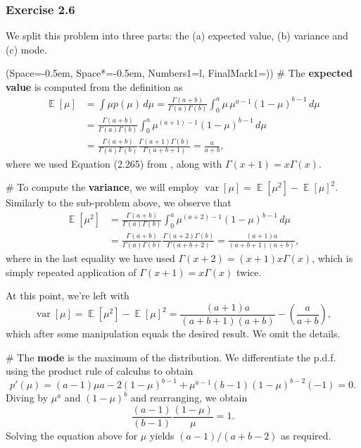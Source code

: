 \documentclass[12pt, a4paper]{article}
\newcommand{\listSpace}{-0.5em}%
\DeclareMathOperator{\E}{\mathbb{E}}
\DeclareMathOperator{\var}{\operatorname{var}}
\begin{document}
\subsubsection*{Exercise 2.6}
We split this problem into three parts: the (a) expected value, (b) variance and (c) mode.
\begin{easylist}[enumerate]
	\ListProperties(Space=\listSpace, Space*=\listSpace, Numbers1=l, FinalMark1={)})
	# The \textbf{expected value} is computed from the definition as
	\begin{align*}
		\E[\mu] &= \int \mu p(\mu) \, d\mu =  \frac{\Gamma(a + b)}{\Gamma(a ) \Gamma( b)} \int_0^a \mu \, \mu^{a-1} (1- \mu)^{b-1} \, d\mu \\
		&= \frac{\Gamma(a + b)}{\Gamma(a ) \Gamma( b)} \int_0^a  \mu^{(a+1)-1} (1- \mu)^{b-1} \, d\mu \tag{re-cast as Beta} \\ 
		&= \frac{\Gamma(a + b)}{\Gamma(a ) \Gamma( b)} \frac{\Gamma(a +1 ) \Gamma( b)}{\Gamma(a + b + 1)} = \frac{a}{a + b},
	\end{align*}
	where we used Equation (2.265) from \cite{bishop_pattern_2011}, along with $\Gamma(x+1) = x\Gamma(x)$.
	
	# To compute the \textbf{variance}, we will employ $\var[\mu] = \E[\mu^2] - \E[\mu]^2$.
	Similarly to the sub-problem above, we observe that
	\begin{align*}
	\E[\mu^2] &= \frac{\Gamma(a + b)}{\Gamma(a ) \Gamma( b)} \int_0^a  \mu^{(a+2)-1} (1- \mu)^{b-1} \, d\mu \\
	&= \frac{\Gamma(a + b)}{\Gamma(a ) \Gamma( b)} \frac{\Gamma(a +2 ) \Gamma( b)}{\Gamma(a + b + 2)}
	= \frac{(a+1) a}{(a + b +1) (a+b)},
	\end{align*}
	where in the last equality we have used $\Gamma(x+2) = (x+1)x \Gamma(x)$, which is simply repeated application of $\Gamma(x+1) = x\Gamma(x)$ twice.
	
	At this point, we're left with
	\begin{equation*}
		\var[\mu] = \E[\mu^2] - \E[\mu]^2 = \frac{(a+1) a}{(a + b +1) (a+b)} - \left( \frac{a}{a + b} \right),
	\end{equation*}
	which after some manipulation equals the desired result.
	We omit the details.
	
	# The \textbf{mode} is the maximum of the distribution.
	We differentiate the p.d.f. using the product rule of calculus to obtain
	\begin{equation*}
		p'(\mu) = (a-1) \mu{a-2} (1-\mu)^{b-1}
		+
		\mu^{a-1} (b-1) (1-\mu)^{b-2}(-1) = 0.
	\end{equation*}
	Diving by $\mu^a$ and $(1-\mu)^b$ and rearranging, we obtain
	\begin{equation*}
		\frac{(a-1)}{(b-1)} \frac{(1 - \mu)}{\mu} = 1.
	\end{equation*}
	Solving the equation above for $\mu$ yields  $(a-1) / (a + b - 2)$ as required.
\end{easylist}
\end{document}

